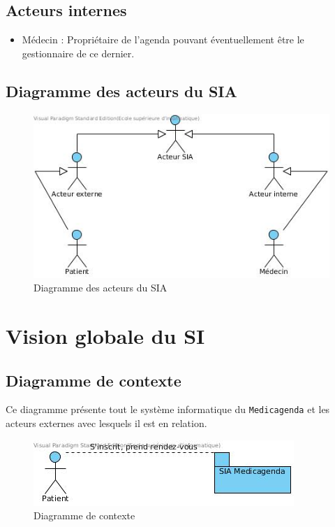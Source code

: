 \documentclass[a4paper, 11pt]{report}
\begin{document}
\subsection{Acteurs internes}
\begin{itemize}
	\item Médecin : Propriétaire de l'agenda pouvant éventuellement être le
		gestionnaire de ce dernier.
\end{itemize}
\subsection{Diagramme des acteurs du SIA}
\begin{figure}[hb]
	\centering
	\includegraphics[scale=0.7]{acteurs.jpg}
	\caption{Diagramme des acteurs du SIA}
	\label{fig:acteurs}
\end{figure}
\newpage
\section{Vision globale du SI}
\subsection{\label{dc}Diagramme de contexte}
Ce diagramme présente tout le système informatique du \texttt{Medicagenda} et les acteurs 
externes avec lesquels il est en relation. 
\begin{figure}[hb]
	\centering
	\includegraphics[scale=0.7]{contexte.jpg}
	\caption{Diagramme de contexte}
	\label{fig:contexte}
\end{figure}
\end{document}
